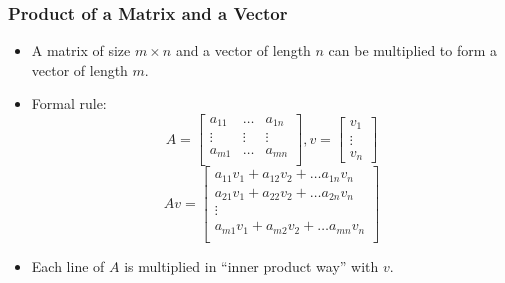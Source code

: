 \documentclass[8pt]{beamer}
\begin{document}
\begin{frame}
  \frametitle{Product of a Matrix and a Vector}
  \begin{itemize}
  \item A matrix of size $m\times n$ and a vector of length $n$ can be multiplied to form a vector of length $m$.
  \item Formal rule:
    $$
    A =
    \begin{bmatrix}
      a_{11}&\dots& a_{1n}\\
      \vdots & \vdots & \vdots\\
      a_{m1}&\dots& a_{mn}\\
    \end{bmatrix},
    v =
    \begin{bmatrix}
      v_1\\\vdots\\ v_n
    \end{bmatrix}
    $$
    $$
    A v =
    \begin{bmatrix}
      a_{11} v_1 + a_{12}v_2 + \dots a_{1n} v_n\\
      a_{21} v_1 + a_{22}v_2 + \dots a_{2n} v_n\\
      \vdots\\
      a_{m1} v_1 + a_{m2}v_2 + \dots a_{mn} v_n\\
    \end{bmatrix}
    $$
    \item Each line of $A$ is multiplied in ``inner product way'' with $v$.
  \end{itemize}
\end{frame}
\end{document}
